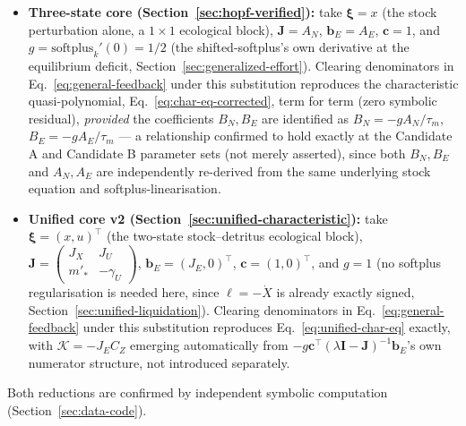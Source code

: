 \documentclass[twocolumn,10pt]{article}
\begin{document}
\begin{itemize}
\item \textbf{Three-state core (Section~\ref{sec:hopf-verified}):} take $\boldsymbol\xi=x$ (the stock perturbation alone, a $1\times1$ ecological block), $\mathbf J=A_N$, $\mathbf b_E=A_E$, $\mathbf c=1$, and $g=\text{softplus}_k'(0)=1/2$ (the shifted-softplus's own derivative at the equilibrium deficit, Section~\ref{sec:generalized-effort}). Clearing denominators in Eq.~\eqref{eq:general-feedback} under this substitution reproduces the characteristic quasi-polynomial, Eq.~\eqref{eq:char-eq-corrected}, term for term (zero symbolic residual), \emph{provided} the coefficients $B_N,B_E$ are identified as $B_N=-gA_N/\tau_m$, $B_E=-gA_E/\tau_m$ --- a relationship confirmed to hold exactly at the Candidate A and Candidate B parameter sets (not merely asserted), since both $B_N,B_E$ and $A_N,A_E$ are independently re-derived from the same underlying stock equation and softplus-linearisation.
\item \textbf{Unified core v2 (Section~\ref{sec:unified-characteristic}):} take $\boldsymbol\xi=(x,u)^\top$ (the two-state stock--detritus ecological block), $\mathbf J=\begin{pmatrix}J_X&J_U\\m'_*&-\gamma_U\end{pmatrix}$, $\mathbf b_E=(J_E,0)^\top$, $\mathbf c=(1,0)^\top$, and $g=1$ (no softplus regularisation is needed here, since $\ell=-\dot X$ is already exactly signed, Section~\ref{sec:unified-liquidation}). Clearing denominators in Eq.~\eqref{eq:general-feedback} under this substitution reproduces Eq.~\eqref{eq:unified-char-eq} exactly, with $\mathcal K=-J_EC_Z$ emerging automatically from $-g\mathbf c^\top(\lambda\mathbf I-\mathbf J)^{-1}\mathbf b_E$'s own numerator structure, not introduced separately.
\end{itemize}
Both reductions are confirmed by independent symbolic computation (Section~\ref{sec:data-code}).
\end{document}
